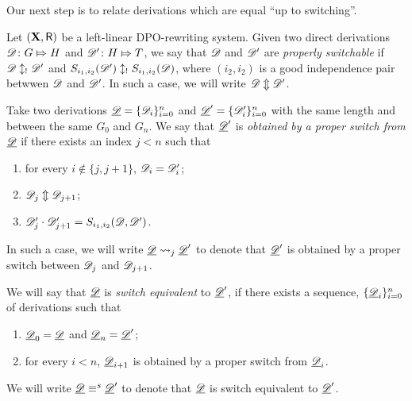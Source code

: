 Our next step is to relate derivations which are equal ``up to switching''.

\begin{definition}
  \label{de:switchable}
  Let $(\textbf {\textup{X}}, \mathsf{R})$ be a left-linear DPO-rewriting system. Given two
  direct derivations $\mathscr{D}\colon G\Mapsto H$ and
  $\mathscr{D}'\colon H\Mapsto T$, we say that $\mathscr{D}$ and $\mathscr{D}'$
  are \emph{properly switchable} if $\mathscr{D}\updownarrow_! \mathscr{D'}$
  and $S_{i_1,i_2}(\mathscr{D}')\updownarrow_!S_{i_1,i_2}(\mathscr{D})$,
  where $(i_2,i_2)$ is a good independence pair betwwen $\mathscr{D}$ and
  $\mathscr{D}'$. In such a case, we will write
  $\mathscr{D}\Updownarrow\mathscr{D}'$.
	
Take two derivations $\underline{\mathscr{D}}=\{\mathscr{D}_{i}\}_{i=0}^n$ and $\underline{\mathscr{D}}'=\{\mathscr{D}'_{i}\}_{i=0}^n$ with the same length and between the same $G_0$ and $G_n$. We say that $\underline{\mathscr{D}}'$ is \emph{obtained by a proper switch from $\underline{\mathscr{D}}$} if there exists an index $j < n$ such that
	\begin{enumerate}
\item for every $i\notin \{j, j+1\} $, $\mathscr{D}_i=\mathscr{D}'_i$;
\item $\mathscr{D}_j \Updownarrow \mathscr{D}_{j+1}$;		
\item $\mathscr{D}'_j\cdot \mathscr{D}'_{j+1} = S_{i_1,i_2}(\mathscr{D}, \mathscr{D}')$.
	\end{enumerate}
	In such a case, we will write $\underline{\mathscr{D}}\rightsquigarrow_j \underline{\mathscr{D}}'$ to denote that $\underline{\mathscr{D}}'$ is obtained by a proper switch between $\mathscr{D}_j$ and $\mathscr{D}_{j+1}$. 
	
	We will say that $\underline{\mathscr{D}}$ is \emph{switch equivalent} to $\underline{\mathscr{D}}'$, if there exists a sequence, $\{\underline{\mathscr{D}}_i\}_{i=0}^n$ of derivations such that
	\begin{enumerate}
		\item $\underline{\mathscr{D}}_0=\underline{\mathscr{D}}$ and $\underline{\mathscr{D}}_n=\underline{\mathscr{D}}'$;
		\item for every $i< n$, $\underline{\mathscr{D}}_{i+1}$ is obtained by a proper switch from $\underline{\mathscr{D}}_i$.
	\end{enumerate}
	
	We will write $\underline{\mathscr{D}} \equiv^s \underline{\mathscr{D}}'$ to denote that $\underline{\mathscr{D}}$ is switch equivalent to $\underline{\mathscr{D}}'$.
\end{definition}


\begin{example}
\end{example}

